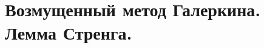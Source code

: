 \documentclass[__main__.tex]{subfiles}
\begin{document}
\section{Возмущенный метод Галеркина. Лемма Стренга.}
\end{document}
